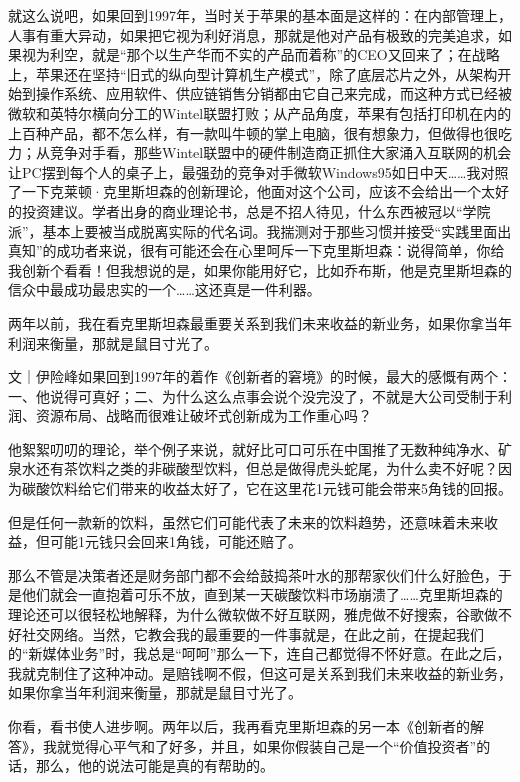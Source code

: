 就这么说吧，如果回到1997年，当时关于苹果的基本面是这样的：在内部管理上，人事有重大异动，如果把它视为利好消息，那就是他对产品有极致的完美追求，如果视为利空，就是``那个以生产华而不实的产品而着称''的CEO又回来了；在战略上，苹果还在坚持``旧式的纵向型计算机生产模式''，除了底层芯片之外，从架构开始到操作系统、应用软件、供应链销售分销都由它自己来完成，而这种方式已经被微软和英特尔横向分工的Wintel联盟打败；从产品角度，苹果有包括打印机在内的上百种产品，都不怎么样，有一款叫牛顿的掌上电脑，很有想象力，但做得也很吃力；从竞争对手看，那些Wintel联盟中的硬件制造商正抓住大家涌入互联网的机会让PC摆到每个人的桌子上，最强劲的竞争对手微软Windows95如日中天\ldots\ldots 我对照了一下克莱顿·克里斯坦森的创新理论，他面对这个公司，应该不会给出一个太好的投资建议。学者出身的商业理论书，总是不招人待见，什么东西被冠以``学院派''，基本上要被当成脱离实际的代名词。我揣测对于那些习惯并接受``实践里面出真知''的成功者来说，很有可能还会在心里呵斥一下克里斯坦森：说得简单，你给我创新个看看！但我想说的是，如果你能用好它，比如乔布斯，他是克里斯坦森的信众中最成功最忠实的一个\ldots\ldots 这还真是一件利器。

两年以前，我在看克里斯坦森最重要关系到我们未来收益的新业务，如果你拿当年利润来衡量，那就是鼠目寸光了。

文｜伊险峰如果回到1997年的着作《创新者的窘境》的时候，最大的感慨有两个：一、他说得可真好；二、为什么这么点事会说个没完没了，不就是大公司受制于利润、资源布局、战略而很难让破坏式创新成为工作重心吗？

他絮絮叨叨的理论，举个例子来说，就好比可口可乐在中国推了无数种纯净水、矿泉水还有茶饮料之类的非碳酸型饮料，但总是做得虎头蛇尾，为什么卖不好呢？因为碳酸饮料给它们带来的收益太好了，它在这里花1元钱可能会带来5角钱的回报。

但是任何一款新的饮料，虽然它们可能代表了未来的饮料趋势，还意味着未来收益，但可能1元钱只会回来1角钱，可能还赔了。

那么不管是决策者还是财务部门都不会给鼓捣茶叶水的那帮家伙们什么好脸色，于是他们就会一直抱着可乐不放，直到某一天碳酸饮料市场崩溃了\ldots\ldots 克里斯坦森的理论还可以很轻松地解释，为什么微软做不好互联网，雅虎做不好搜索，谷歌做不好社交网络。当然，它教会我的最重要的一件事就是，在此之前，在提起我们的``新媒体业务''时，我总是``呵呵''那么一下，连自己都觉得不怀好意。在此之后，我就克制住了这种冲动。是赔钱啊不假，但这可是关系到我们未来收益的新业务，如果你拿当年利润来衡量，那就是鼠目寸光了。

你看，看书使人进步啊。两年以后，我再看克里斯坦森的另一本《创新者的解答》，我就觉得心平气和了好多，并且，如果你假装自己是一个``价值投资者''的话，那么，他的说法可能是真的有帮助的。

